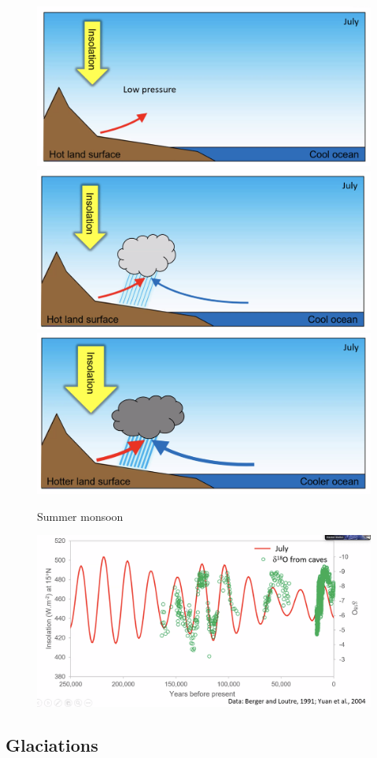 \begin{figure}[H]
    \centering
    \includegraphics[width=0.5\linewidth]{content/img/monsoon_1.png}
    \includegraphics[width=0.5\linewidth]{content/img/monsoon_2.png}
    \includegraphics[width=0.5\linewidth]{content/img/monsoon_3.png}
    \caption{Summer monsoon}
\end{figure}

\begin{figure}[H]
    \centering
    \includegraphics[width=0.75\linewidth]{content/img/monsoons_cave_proxy.png}
\end{figure}

\subsection{Glaciations}

